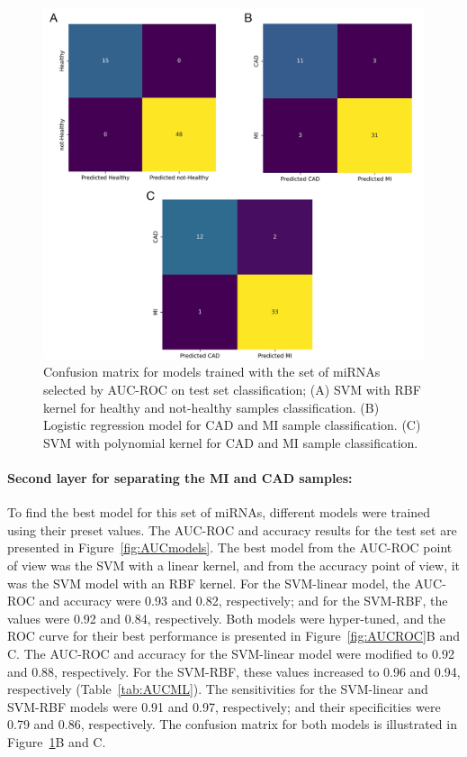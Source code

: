 \documentclass[sn-mathphys,Numbered]{sn-jnl}%
\theoremstyle{thmstyleone}%
\theoremstyle{thmstyletwo}%
\theoremstyle{thmstylethree}%
\begin{document}
\begin{figure}
\centering 
\includegraphics[width=0.9\linewidth]{AUC Conf. matrix}
\caption{Confusion matrix for models trained with the set of miRNAs selected by AUC-ROC on test set classification; (A) SVM with RBF kernel for healthy and not-healthy samples classification. (B) Logistic regression model for CAD and MI sample classification. (C) SVM with polynomial kernel for CAD and MI sample classification.}\label{fig:AUCCF}
\end{figure}

\paragraph{Second layer for separating the MI and CAD
samples:}\label{second-layer-for-separating-the-mi-and-cad-samples-3}

To find the best model for this set of miRNAs, different models were
trained using their preset values. The AUC-ROC and accuracy results for
the test set are presented in Figure~\ref{fig:AUCmodels}. The best model
from the AUC-ROC point of view was the SVM with a linear kernel, and
from the accuracy point of view, it was the SVM model with an RBF
kernel. For the SVM-linear model, the AUC-ROC and accuracy were 0.93 and
0.82, respectively; and for the SVM-RBF, the values were 0.92 and 0.84,
respectively. Both models were hyper-tuned, and the ROC curve for their
best performance is presented in Figure~\ref{fig:AUCROC}B and C. The
AUC-ROC and accuracy for the SVM-linear model were modified to 0.92 and
0.88, respectively. For the SVM-RBF, these values increased to 0.96 and
0.94, respectively (Table~\ref{tab:AUCML}). The sensitivities for the
SVM-linear and SVM-RBF models were 0.91 and 0.97, respectively; and
their specificities were 0.79 and 0.86, respectively. The confusion
matrix for both models is illustrated in Figure~\ref{fig:AUCCF}B and C.
\end{document}
